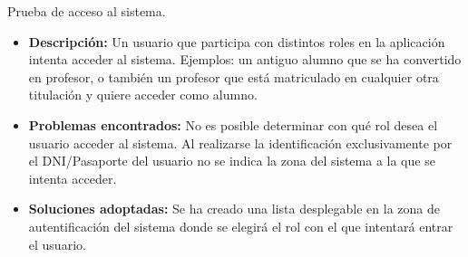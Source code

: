 \item Prueba de acceso al sistema.
  \begin{itemize}
    \item \textbf{Descripción:} Un usuario que participa con distintos roles en
      la aplicación intenta acceder al sistema. Ejemplos: un antiguo alumno que
      se ha convertido en profesor, o también un profesor que está matriculado
      en cualquier otra titulación y quiere acceder como alumno.
    \item \textbf{Problemas encontrados:} No es posible determinar con qué rol
      desea el usuario acceder al sistema. Al realizarse la identificación
      exclusivamente por el DNI/Pasaporte del usuario no se indica la zona del
      sistema a la que se intenta acceder.
    \item \textbf{Soluciones adoptadas:} Se ha creado una lista desplegable
      en la zona de autentificación del sistema donde se elegirá el rol con
      el que intentará entrar el usuario.
  \end{itemize}

